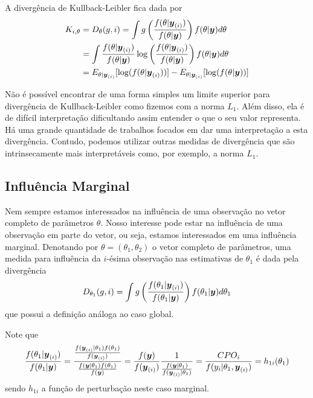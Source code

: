 A divergência de Kullback-Leibler fica dada por 
\begin{equation}
\begin{split}
K_{i,\theta} &= D_\theta(g,i)=\int g\left(\frac{f(\theta|{\boldsymbol{y}_{(i)}})}{f(\theta|{\boldsymbol{y}})}\right)f(\theta|{\boldsymbol{y}}) d\theta \\
{}  &=\int \frac{f(\theta|{\boldsymbol{y}_{(i)}})}{f(\theta|{\boldsymbol{y}})}\log\left(\frac{f(\theta|{\boldsymbol{y}_{(i)}})}{f(\theta|{\boldsymbol{y}})}\right)f(\theta|{\boldsymbol{y}}) d\theta \\
{}&= E_{\theta|{\boldsymbol{y}_{(i)}}}[\log(f(\theta|{\boldsymbol{y}_{(i)}}))]-E_{\theta|{\boldsymbol{y}_{(i)}}}[\log(f(\theta|{\boldsymbol{y}}))]
\end{split}
\end{equation}

Não é possível encontrar de uma forma simples um limite superior para divergência de Kullback-Leibler como fizemos com a norma $L_1$. Além disso, ela é de difícil interpretação dificultando assim entender o que o seu valor representa. Há uma grande quantidade de trabalhos focados em dar uma interpretação a esta divergência. Contudo, podemos utilizar outras medidas de divergência que são intrinsecamente mais interpretáveis como, por exemplo, a norma $L_1$. 

\subsection{Influência Marginal}

Nem sempre estamos interessados na influência de uma observação no vetor completo de parâmetros $\theta$. Nosso interesse pode estar na influência de uma observação em parte do vetor, ou seja, estamos interessados em uma influência marginal. Denotando por $\theta=(\theta_1,\theta_2)$ o vetor completo de parâmetros, uma medida para influência da $i$-ésima observação nas estimativas de $\theta_1$ é dada pela divergência 
\begin{equation}
D_{\theta_1}(g,i) = \int g\left(\frac{f(\theta_1|{\boldsymbol{y}_{(i)}})}{f(\theta_1|{\boldsymbol{y}})}\right) f(\theta_1|{\boldsymbol{y}}) d\theta_1
\end{equation}
que possui a definição análoga ao caso global.

Note que 
\begin{equation}
\frac{f(\theta_1|{\boldsymbol{y}_{(i)}})}{f(\theta_1|{\boldsymbol{y}})} = \frac{\frac{f({\boldsymbol{y}_{(i)}}|\theta_1)f(\theta_1)}{f({\boldsymbol{y}_{(i)}})}}{\frac{f({\boldsymbol{y}}|\theta_1)f(\theta_1)}{f({\boldsymbol{y}})}} = \frac{f({\boldsymbol{y}})}{f({\boldsymbol{y}_{(i)}})}\frac{1}{\frac{f({\boldsymbol{y}}|\theta_1)}{f({\boldsymbol{y}_{(i)}}|\theta_1)}} = \frac{CPO_i}{f(y_i|\theta_1,{\boldsymbol{y}_{(i)}})}=h_{1i}(\theta_1)
\end{equation}
sendo $h_{1i}$ a função de perturbação neste caso marginal.


